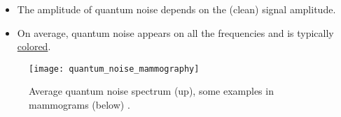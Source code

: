 \label{sec:radiography_quantum_noise}
\begin{itemize}
\item The amplitude of quantum noise depends on the (clean) signal amplitude.  
\item On average, quantum noise appears on all the frequencies and is typically \href{https://en.wikipedia.org/wiki/Colors_of_noise}{colored}.
\end{itemize}
\vspace{-1ex}
\begin{figure}[!b]
  \centering
    \texttt{[image: quantum\_noise\_mammography]}
    \caption{Average quantum noise spectrum (up), some examples in mammograms (below) 
      \cite{saunders2007does}.\label{fig:quantum_noise_X-rays_spectrum}}
\end{figure}
